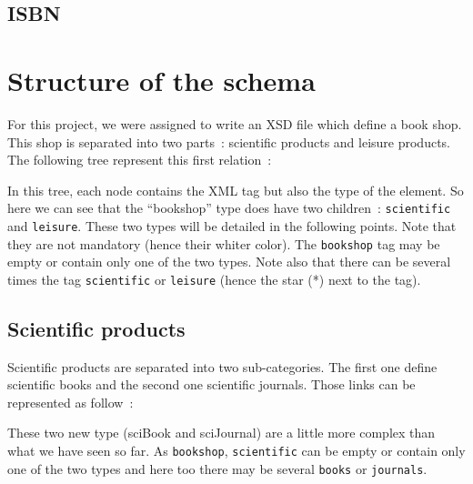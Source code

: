 \documentclass{article}
\begin{document}
  \subsection{ISBN}
    \label{sec:isbn}
  
  
\section{Structure of the schema}
  For this project, we were assigned to write an XSD file which define a book shop. This shop is separated into two parts~: scientific products and leisure products. The following tree represent this first relation~:
  \begin{center}
  \end{center}
  In this tree, each node contains the XML tag but also the type of the element.
  So here we can see that the ``bookshop'' type does have two children~: \verb|scientific| and \verb|leisure|. These two types will be detailed in the following points.
  Note that they are not mandatory (hence their whiter color).  The \verb|bookshop| tag may be empty or contain only one of the two types.  Note also that there can be several times the tag \verb|scientific| or \verb|leisure| (hence the star (*) next to the tag).
  
  \subsection{Scientific products}
    Scientific products are separated into two sub-categories. The first one define scientific books and the second one scientific journals. Those links can be represented as follow~:
    \begin{center}
    \end{center}
    These two new type (sciBook and sciJournal) are a little more complex than what we have seen so far.  As \verb|bookshop|, \verb|scientific| can be empty or contain only one of the two types and here too there may be several \verb|books| or \verb|journals|.
    
\end{document}
